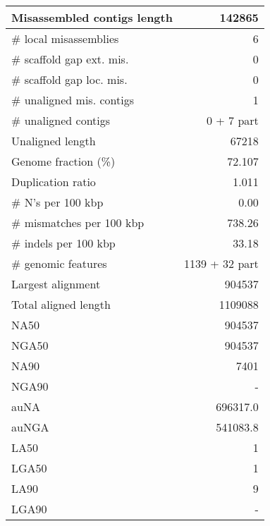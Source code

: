 \documentclass[12pt,a4paper]{article}
\begin{document}
\begin{table}[ht]
\begin{center}
\begin{tabular}{|l*{1}{|r}|}
Misassembled contigs length & 142865 \\ \hline
\# local misassemblies & 6 \\ \hline
\# scaffold gap ext. mis. & 0 \\ \hline
\# scaffold gap loc. mis. & 0 \\ \hline
\# unaligned mis. contigs & 1 \\ \hline
\# unaligned contigs & 0 + 7 part \\ \hline
Unaligned length & 67218 \\ \hline
Genome fraction (\%) & 72.107 \\ \hline
Duplication ratio & 1.011 \\ \hline
\# N's per 100 kbp & 0.00 \\ \hline
\# mismatches per 100 kbp & 738.26 \\ \hline
\# indels per 100 kbp & 33.18 \\ \hline
\# genomic features & 1139 + 32 part \\ \hline
Largest alignment & 904537 \\ \hline
Total aligned length & 1109088 \\ \hline
NA50 & 904537 \\ \hline
NGA50 & 904537 \\ \hline
NA90 & 7401 \\ \hline
NGA90 & - \\ \hline
auNA & 696317.0 \\ \hline
auNGA & 541083.8 \\ \hline
LA50 & 1 \\ \hline
LGA50 & 1 \\ \hline
LA90 & 9 \\ \hline
LGA90 & - \\ \hline
\end{tabular}
\end{center}
\end{table}
\end{document}
